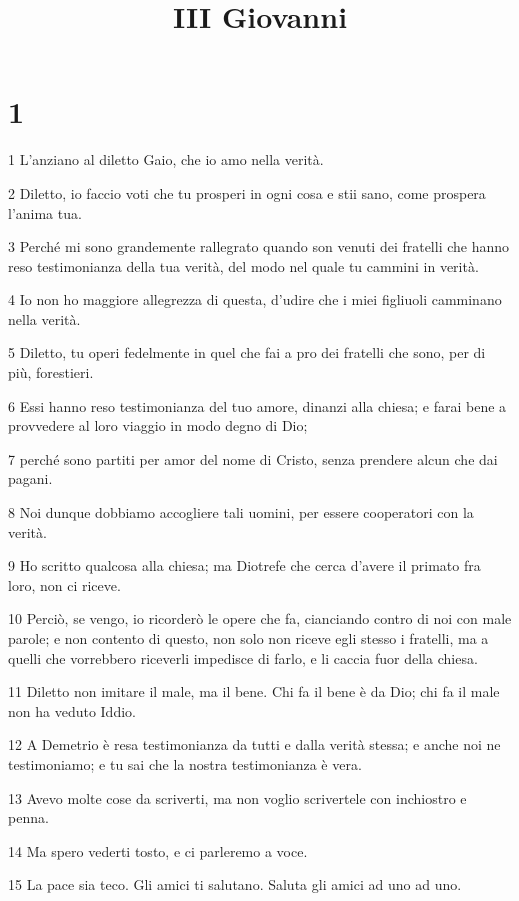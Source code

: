 

\title{III Giovanni}


\chapter{1}

\par 1 L'anziano al diletto Gaio, che io amo nella verità.
\par 2 Diletto, io faccio voti che tu prosperi in ogni cosa e stii sano, come prospera l'anima tua.
\par 3 Perché mi sono grandemente rallegrato quando son venuti dei fratelli che hanno reso testimonianza della tua verità, del modo nel quale tu cammini in verità.
\par 4 Io non ho maggiore allegrezza di questa, d'udire che i miei figliuoli camminano nella verità.
\par 5 Diletto, tu operi fedelmente in quel che fai a pro dei fratelli che sono, per di più, forestieri.
\par 6 Essi hanno reso testimonianza del tuo amore, dinanzi alla chiesa; e farai bene a provvedere al loro viaggio in modo degno di Dio;
\par 7 perché sono partiti per amor del nome di Cristo, senza prendere alcun che dai pagani.
\par 8 Noi dunque dobbiamo accogliere tali uomini, per essere cooperatori con la verità.
\par 9 Ho scritto qualcosa alla chiesa; ma Diotrefe che cerca d'avere il primato fra loro, non ci riceve.
\par 10 Perciò, se vengo, io ricorderò le opere che fa, cianciando contro di noi con male parole; e non contento di questo, non solo non riceve egli stesso i fratelli, ma a quelli che vorrebbero riceverli impedisce di farlo, e li caccia fuor della chiesa.
\par 11 Diletto non imitare il male, ma il bene. Chi fa il bene è da Dio; chi fa il male non ha veduto Iddio.
\par 12 A Demetrio è resa testimonianza da tutti e dalla verità stessa; e anche noi ne testimoniamo; e tu sai che la nostra testimonianza è vera.
\par 13 Avevo molte cose da scriverti, ma non voglio scrivertele con inchiostro e penna.
\par 14 Ma spero vederti tosto, e ci parleremo a voce.
\par 15 La pace sia teco. Gli amici ti salutano. Saluta gli amici ad uno ad uno.


